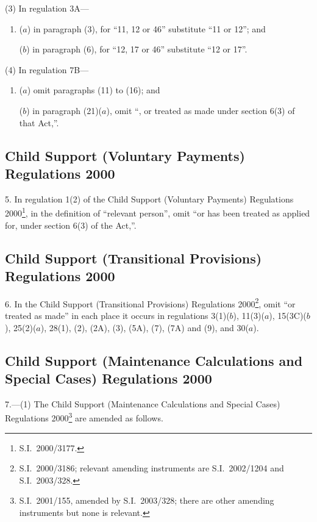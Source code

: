 \documentclass[12pt,a4paper]{article}
\begin{document}
(3) In regulation 3A—
\begin{enumerate}\item[]
($a$) in paragraph (3), for “11, 12 or 46” substitute “11 or 12”; and

($b$) in paragraph (6), for “12, 17 or 46” substitute “12 or 17”.
\end{enumerate}

(4) In regulation 7B—
\begin{enumerate}\item[]
($a$) omit paragraphs (11) to (16); and

($b$) in paragraph (21)($a$), omit “, or treated as made under section 6(3) of that Act,”.
\end{enumerate}

\subsection[5. Child Support (Voluntary Payments) Regulations 2000]{Child Support (Voluntary Payments) Regulations 2000}

5.  In regulation 1(2) of the Child Support (Voluntary Payments) Regulations 2000\footnote{S.I.~2000/3177.}, in the definition of “relevant person”, omit “or has been treated as applied for, under section 6(3) of the Act,”.

\subsection[6. Child Support (Transitional Provisions) Regulations 2000]{\sloppy Child Support (Transitional Provisions) Regulations 2000}

6.  In the Child Support (Transitional Provisions) Regulations 2000\footnote{S.I.~2000/3186; relevant amending instruments are S.I.~2002/1204 and S.I.~2003/328.}, omit “or treated as made” in each place it occurs in regulations 3(1)($b$), 11(3)($a$), 15(3C)($b$), 25(2)($a$), 28(1), (2), (2A), (3), (5A), (7), (7A) and (9), and 30($a$).

\subsection[7. Child Support (Maintenance Calculations and Special Cases) Regulations 2000]{Child Support (Maintenance Calculations and Special Cases) Regulations 2000}

7.---(1)  The Child Support (Maintenance Calculations and Special Cases) Regulations 2000\footnote{S.I.~2001/155, amended by S.I.~2003/328; there are other amending instruments but none is relevant.} are amended as follows.
\end{document}
